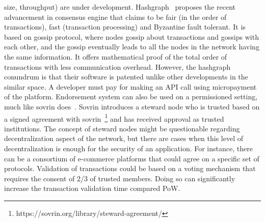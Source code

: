 size, throughput) are under development. Hashgraph~\cite{baird2016hashgraph}
proposes the recent advancement in consensus engine that claims to be fair (in
the order of transactions), fast (transaction processing) and Byzantine fault
tolerant. It is based on gossip protocol, where nodes gossip about transactions
and gossips with each other, and the gossip eventually leads to all the nodes
in the network having the same information. It offers mathematical proof of the
total order of transactions with less communication overhead. However, the
hashgraph conundrum is that their software is patented unlike other
developments in the similar space. A developer must pay for making an API call
using micropayment of the platform. Endorsement system can also be used on a
permissioned setting, much like sovrin does~\cite{tobin2016inevitable}. Sovrin
introduces a steward node who is trusted based on a signed agreement with
sovrin~\footnote{https://sovrin.org/library/steward-agreement/} and has
received approval as trusted institutions. The concept of steward nodes might
be questionable regarding decentralization aspect of the network, but there are
cases when this level of decentralization is enough for the security of an
application. For instance, there can be a consortium of e-commerce platforms
that could agree on a specific set of protocols. Validation of transactions
could be based on a voting mechanism that requires the consent of 2/3 of
trusted members. Doing so can significantly increase the transaction validation
time compared PoW.










